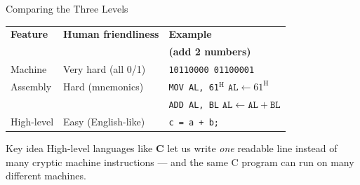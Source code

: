\documentclass[aspectratio=169]{beamer}
\begin{document}
	\begin{frame}{Comparing the Three Levels}
		\renewcommand{\arraystretch}{1.4}
		\centering
		\begin{tabular}{@{}p{2.4cm}p{4.0cm}p{5.0cm}@{}}
			\toprule
			\textbf{Feature} & \textbf{Human friendliness} & \textbf{Example} \\
			&  & \textbf{(add 2 numbers)} \\
			\midrule
			Machine   & Very hard (all 0/1)          & \texttt{10110000 01100001} \\
			Assembly  & Hard (mnemonics)             & \texttt{MOV AL, 61$^\text{H}$} \qquad $\texttt{AL} \leftarrow 61^\text{H}$ \\
			&               & \texttt{ADD AL, BL} \qquad $\texttt{AL} \leftarrow \texttt{AL} + \texttt{BL}$\\
			High-level& Easy (English-like)          & \texttt{c = a + b;} \\
			\bottomrule
		\end{tabular}
		\vspace{0.4cm}
		\begin{block}{Key idea}
			High-level languages like \textbf{C} let us write \emph{one} readable line instead of many cryptic machine instructions --- and the same C program can run on many different machines.
		\end{block}
	\end{frame}
	
\end{document}
